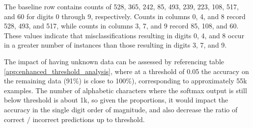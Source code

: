 The baseline row contains counts of 528, 365, 242, 85, 493, 239, 223, 108, 517, and 60 for digits 0 through 9, respectively. Counts in columns 0, 4, and 8 record 528, 493, and 517, while counts in columns 3, 7, and 9 record 85, 108, and 60. These values indicate that misclassifications resulting in digits 0, 4, and 8 occur in a greater number of instances than those resulting in digits 3, 7, and 9.

The impact of having unknown data can be assessed by referencing table \ref{app:enhanced_threshold_analysis}, where at a threshold of 0.05 the accuracy on the remaining data (91\%) is close to 100\%), corresponding to approximately 55k examples. The number of alphabetic characters where the softmax output is still below threshold is about 1k, so given the proportions, it would impact the accuracy in the single digit order of magnitude, and also decrease the ratio of correct / incorrect predictions up to threshold.

